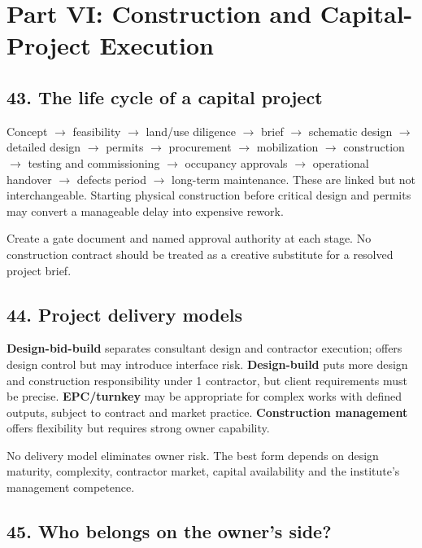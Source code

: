 \section*{Part VI: Construction and Capital-Project Execution}


\subsection{43. The life cycle of a capital project}

Concept $\rightarrow$ feasibility $\rightarrow$ land/use diligence $\rightarrow$ brief $\rightarrow$ schematic design $\rightarrow$ detailed design $\rightarrow$ permits $\rightarrow$ procurement $\rightarrow$ mobilization $\rightarrow$ construction $\rightarrow$ testing and commissioning $\rightarrow$ occupancy approvals $\rightarrow$ operational handover $\rightarrow$ defects period $\rightarrow$ long-term maintenance. These are linked but not interchangeable. Starting physical construction before critical design and permits may convert a manageable delay into expensive rework.

Create a gate document and named approval authority at each stage. No construction contract should be treated as a creative substitute for a resolved project brief.


\subsection{44. Project delivery models}

\textbf{Design-bid-build} separates consultant design and contractor execution; offers design control but may introduce interface risk. \textbf{Design-build} puts more design and construction responsibility under 1 contractor, but client requirements must be precise. \textbf{EPC/turnkey} may be appropriate for complex works with defined outputs, subject to contract and market practice. \textbf{Construction management} offers flexibility but requires strong owner capability.

No delivery model eliminates owner risk. The best form depends on design maturity, complexity, contractor market, capital availability and the institute's management competence.


\subsection{45. Who belongs on the owner's side?}

